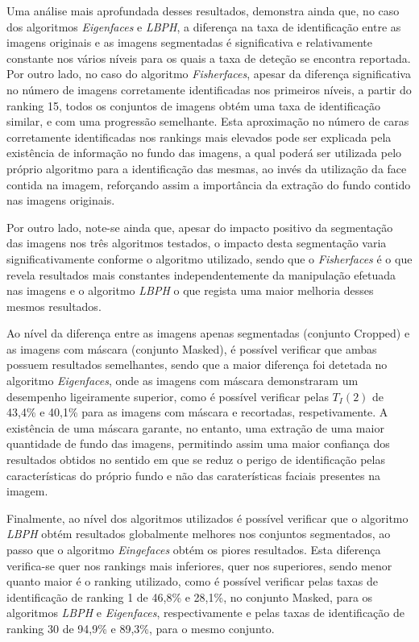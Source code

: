 Uma análise mais aprofundada desses resultados, demonstra ainda que, no caso dos algoritmos \textit{Eigenfaces} e \textit{LBPH}, a diferença na taxa de identificação entre as imagens originais e as imagens segmentadas é significativa e relativamente constante nos vários níveis para os quais a taxa de deteção se encontra reportada. Por outro lado, no caso do algoritmo \textit{Fisherfaces}, apesar da diferença significativa no número de imagens corretamente identificadas nos primeiros níveis, a partir do ranking 15, todos os conjuntos de imagens obtém uma taxa de identificação similar, e com uma progressão semelhante. Esta aproximação no número de caras corretamente identificadas nos rankings mais elevados pode ser explicada pela existência de informação no fundo das imagens, a qual poderá ser utilizada pelo próprio algoritmo para a identificação das mesmas, ao invés da utilização da face contida na imagem, reforçando assim a importância da extração do fundo contido nas imagens originais.

Por outro lado, note-se ainda que, apesar do impacto positivo da segmentação das imagens nos três algoritmos testados, o impacto desta segmentação varia significativamente conforme o algoritmo utilizado, sendo que o \textit{Fisherfaces} é o que revela resultados mais constantes independentemente da manipulação efetuada nas imagens e o algoritmo \textit{LBPH} o que regista uma maior melhoria desses mesmos resultados.

Ao nível da diferença entre as imagens apenas segmentadas (conjunto Cropped) e as imagens com máscara (conjunto Masked), é possível verificar que ambas possuem resultados semelhantes, sendo que a maior diferença foi detetada no algoritmo \textit{Eigenfaces}, onde as imagens com máscara demonstraram um desempenho ligeiramente superior, como é possível verificar pelas $T_{I}(2)$ de 43,4\% e 40,1\% para as imagens com máscara e recortadas, respetivamente. A existência de uma máscara garante, no entanto, uma extração de uma maior quantidade de fundo das imagens, permitindo assim uma maior confiança dos resultados obtidos no sentido em que se reduz o perigo de identificação pelas características do próprio fundo e não das caraterísticas faciais presentes na imagem. 

Finalmente, ao nível dos algoritmos utilizados é possível verificar que o algoritmo \textit{LBPH} obtém resultados globalmente melhores nos conjuntos segmentados, ao passo que o algoritmo \textit{Eingefaces} obtém os piores resultados. Esta diferença verifica-se quer nos rankings mais inferiores, quer nos superiores, sendo menor quanto maior é o ranking utilizado, como é possível verificar pelas taxas de identificação de ranking 1 de 46,8\% e 28,1\%, no conjunto Masked, para os algoritmos \textit{LBPH} e \textit{Eigenfaces}, respectivamente e pelas taxas de identificação de ranking 30 de 94,9\% e 89,3\%, para o mesmo conjunto.

